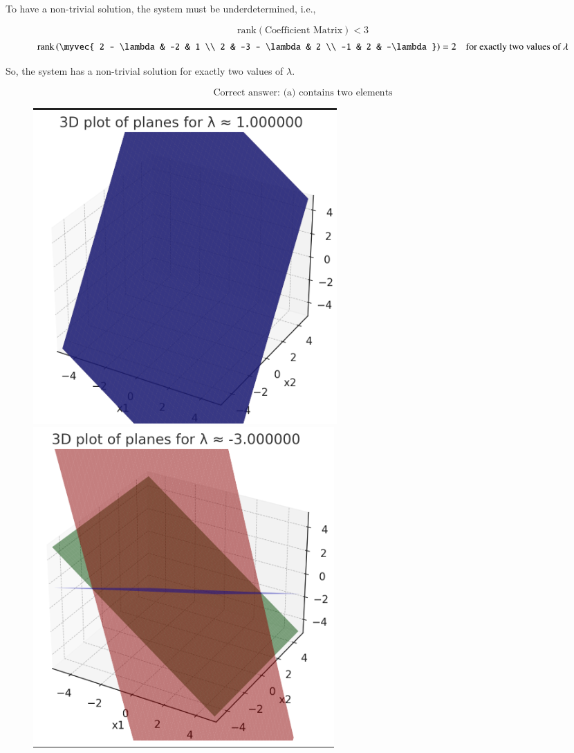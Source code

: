 \documentclass[journal]{IEEEtran}
\begin{document}
To have a non-trivial solution, the system must be underdetermined, i.e.,

\[
\text{rank}(\text{Coefficient Matrix}) < 3
\]
\[
\text{rank}\left(
\myvec{
2 - \lambda & -2 & 1 \\
2 & -3 - \lambda & 2 \\
-1 & 2 & -\lambda
}
\right) = 2
\quad \text{for exactly two values of } \lambda
\]

So, the system has a non-trivial solution for exactly two values of \( \lambda \).

\[
\boxed{\text{Correct answer: (a) contains two elements}}
\]

\begin{figure}[h!]
    \centering
    \includegraphics[height=0.4\textheight, keepaspectratio]{5.13.12fig.png}

      \includegraphics[height=0.4\textheight, keepaspectratio]{5.13.12fig(1).png}
   
    \label{figure_1}
\end{figure}
 
\end{document}
